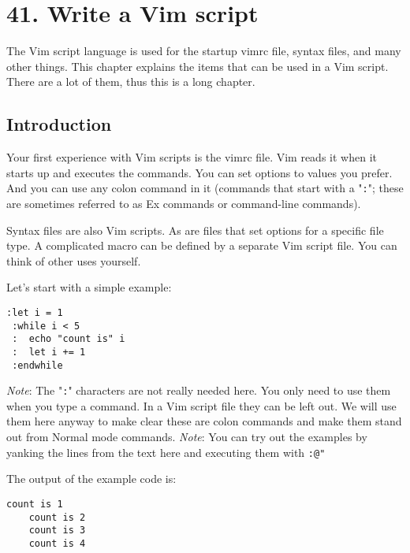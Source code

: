 \section{41. Write a Vim script}
\label{Write a Vim script}
The Vim script language is used for the startup vimrc file, syntax files, and many other things.
This chapter explains the items that can be used in a Vim script.
There are a lot of them, thus this is a long chapter.
\localtableofcontents
\subsection{Introduction}
\label{vim-script-intro}
\label{script}
Your first experience with Vim scripts is the vimrc file.
Vim reads it when it starts up and executes the commands.
You can set options to values you prefer.
And you can use any colon command in it (commands that start with a "\texttt{:}"; these are sometimes referred to as Ex commands or command-line commands).

Syntax files are also Vim scripts.
As are files that set options for a specific file type.
A complicated macro can be defined by a separate Vim script file.
You can think of other uses yourself.

Let's start with a simple example:

\begin{Verbatim}[samepage=true]
 :let i = 1
 :while i < 5
 :  echo "count is" i
 :  let i += 1
 :endwhile
\end{Verbatim}

\emph{Note}: The "\texttt{:}" characters are not really needed here.
You only need to use them when you type a command.
In a Vim script file they can be left out.
We will use them here anyway to make clear these are colon commands and make them stand out from Normal mode commands.
\emph{Note}: You can try out the examples by yanking the lines from the text here and executing them with \texttt{:@"}

The output of the example code is:

\begin{Verbatim}[samepage=true]
    count is 1
    count is 2
    count is 3
    count is 4
\end{Verbatim}

